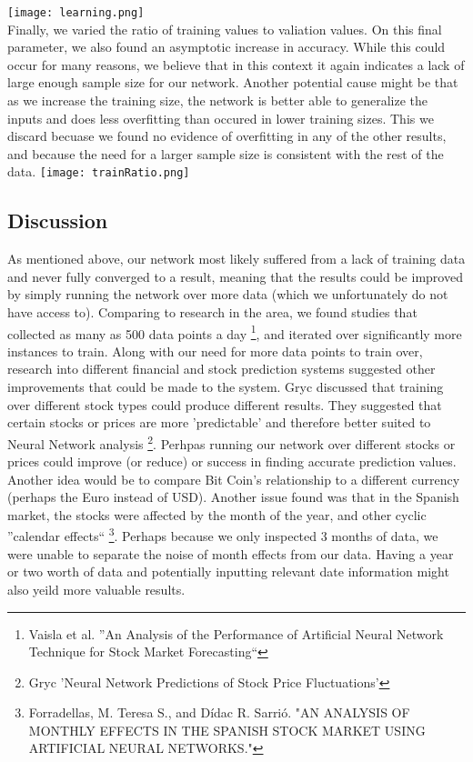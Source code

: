 \documentclass[a4paper,11pt]{article}
\begin{document}
\newline
\texttt{[image: learning.png]} \\
\newline
Finally, we varied the ratio of training values to valiation values. On this final parameter, we also found an asymptotic increase in accuracy. While this could occur for many reasons, we believe that in this context it again indicates a lack of large enough sample size for our network. Another potential cause might be that as we increase the training size, the network is better able to generalize the inputs and does less overfitting than occured in lower training sizes. This we discard becuase we found no evidence of overfitting in any of the other results, and because the need for a larger sample size is consistent with the rest of the data. 
\newline
\texttt{[image: trainRatio.png]} \\
\newline
\subsection{Discussion}
As mentioned above, our network most likely suffered from a lack of training data and never fully converged to a result, meaning that the results could be improved by simply running the network over more data (which we unfortunately do not have access to). Comparing to research in the area, we found studies that collected as many as 500 data points a day \footnote{Vaisla et al. ''An Analysis of the Performance of Artificial
Neural Network Technique for Stock Market Forecasting``}, and iterated over significantly more instances to train. \newline
Along with our need for more data points to train over, research into different financial and stock prediction systems suggested other improvements that could be made to the system. 
Gryc discussed that training over different stock types could produce different results. They suggested that certain stocks or prices are more 'predictable' and therefore better suited to Neural Network analysis \footnote{Gryc 'Neural Network Predictions of Stock Price Fluctuations'}. Perhpas running our network over different stocks or prices could improve (or reduce) or success in finding accurate prediction values. Another idea would be to compare Bit Coin's relationship to a different currency (perhaps the Euro instead of USD). 
Another issue found was that in the Spanish market, the stocks were affected by the month of the year, and other cyclic ''calendar effects`` \footnote{Forradellas, M. Teresa S., and Dídac R. Sarrió. "AN ANALYSIS OF MONTHLY EFFECTS IN THE SPANISH STOCK MARKET USING ARTIFICIAL NEURAL NETWORKS."}. Perhaps because we only inspected 3 months of data, we were unable to separate the noise of month effects from our data. Having a year or two worth of data and potentially inputting relevant date information might also yeild more valuable results. 
\end{document}

